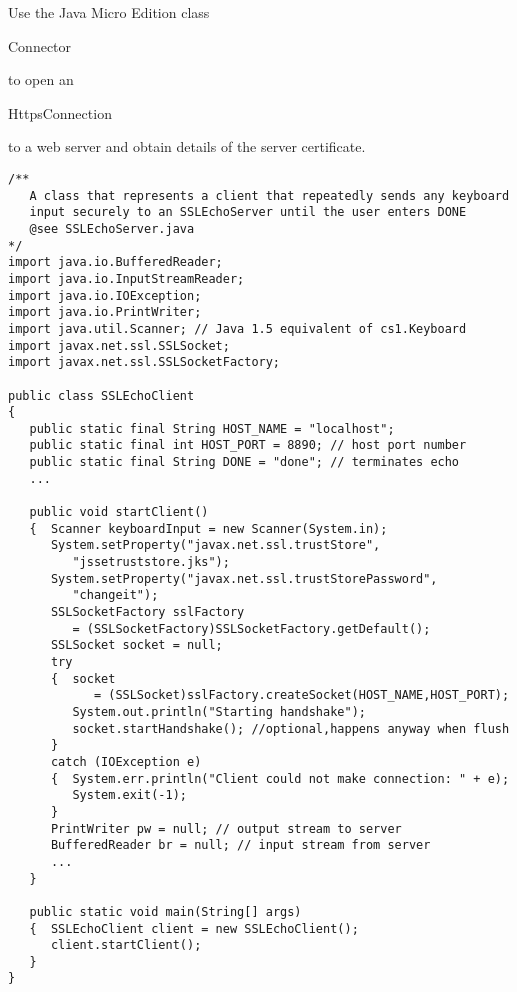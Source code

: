 \begin{exercise}
	Use the Java Micro Edition class \begin{code}Connector\end{code} to open an
	\begin{code}HttpsConnection\end{code} to a web server and obtain details of
	the server certificate.
\end{exercise}

\begin{figure*}\begin{program}\begin{verbatim}
/**
   A class that represents a client that repeatedly sends any keyboard
   input securely to an SSLEchoServer until the user enters DONE
   @see SSLEchoServer.java
*/
import java.io.BufferedReader;
import java.io.InputStreamReader;
import java.io.IOException;
import java.io.PrintWriter;
import java.util.Scanner; // Java 1.5 equivalent of cs1.Keyboard
import javax.net.ssl.SSLSocket;
import javax.net.ssl.SSLSocketFactory;

public class SSLEchoClient
{
   public static final String HOST_NAME = "localhost";
   public static final int HOST_PORT = 8890; // host port number
   public static final String DONE = "done"; // terminates echo
   ...

   public void startClient()
   {  Scanner keyboardInput = new Scanner(System.in);
      System.setProperty("javax.net.ssl.trustStore",
         "jssetruststore.jks");
      System.setProperty("javax.net.ssl.trustStorePassword",
         "changeit");
      SSLSocketFactory sslFactory
         = (SSLSocketFactory)SSLSocketFactory.getDefault();
      SSLSocket socket = null;
      try
      {  socket
            = (SSLSocket)sslFactory.createSocket(HOST_NAME,HOST_PORT);
         System.out.println("Starting handshake");
         socket.startHandshake(); //optional,happens anyway when flush
      }
      catch (IOException e)
      {  System.err.println("Client could not make connection: " + e);
         System.exit(-1);
      }
      PrintWriter pw = null; // output stream to server
      BufferedReader br = null; // input stream from server
      ...
   }

   public static void main(String[] args)
   {  SSLEchoClient client = new SSLEchoClient();
      client.startClient();
   }
}
\end{verbatim}\end{program}\end{figure*}

